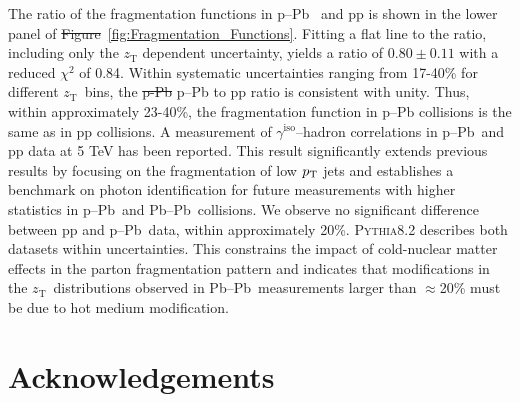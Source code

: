 \documentclass[ALICE,manyauthors]{cernphprep}
\newcommand{\zt}{\ensuremath{z_{\mathrm{T}}}\xspace}
\newcommand{\gammaiso}{\ensuremath{\gamma^\mathrm{iso}}}
\newcommand{\PbPb}         {\mbox{Pb--Pb}\xspace}
\newcommand{\pPb}          {\mbox{p--Pb}\xspace}
\newcommand{\pt}           {\ensuremath{p_{\rm T}}\xspace}
\providecommand{\DIFaddtex}[1]{{\protect\color{blue}\uwave{#1}}} %
\providecommand{\DIFdeltex}[1]{{\protect\color{red}\sout{#1}}}                      %
\providecommand{\DIFaddbegin}{} %
\providecommand{\DIFaddend}{} %
\providecommand{\DIFdelbegin}{} %
\providecommand{\DIFdelend}{} %
\providecommand{\DIFadd}[1]{\texorpdfstring{\DIFaddtex{#1}}{#1}} %
\providecommand{\DIFdel}[1]{\texorpdfstring{\DIFdeltex{#1}}{}} %
\newcommand{\DIFscaledelfig}{0.5}
\newlength{\DIFdelgraphicswidth} %
\newlength{\DIFdelgraphicsheight} %
\newcommand{\DIFaddincludegraphics}[2][]{{\color{blue}\fbox{\DIFOincludegraphics[#1]{#2}}}} %
\newcommand{\DIFdelincludegraphics}[2][]{%
\sbox{\DIFdelgraphicsbox}{\DIFOincludegraphics[#1]{#2}}%
\settoboxwidth{\DIFdelgraphicswidth}{\DIFdelgraphicsbox} %
\settoboxtotalheight{\DIFdelgraphicsheight}{\DIFdelgraphicsbox} %
\scalebox{\DIFscaledelfig}{%
\parbox[b]{\DIFdelgraphicswidth}{\usebox{\DIFdelgraphicsbox}\\[-\baselineskip] \rule{\DIFdelgraphicswidth}{0em}}\llap{\resizebox{\DIFdelgraphicswidth}{\DIFdelgraphicsheight}{%
\setlength{\unitlength}{\DIFdelgraphicswidth}%
\begin{picture}(1,1)%
\thicklines\linethickness{2pt} %
{\color[rgb]{1,0,0}\put(0,0){\framebox(1,1){}}}%
{\color[rgb]{1,0,0}\put(0,0){\line( 1,1){1}}}%
{\color[rgb]{1,0,0}\put(0,1){\line(1,-1){1}}}%
\end{picture}%
}\hspace*{3pt}}} %
} %
\DeclareRobustCommand{\DIFaddbegin}{\DIFOaddbegin \let\includegraphics\DIFaddincludegraphics} %
\DeclareRobustCommand{\DIFaddend}{\DIFOaddend \let\includegraphics\DIFOincludegraphics} %
\DeclareRobustCommand{\DIFdelbegin}{\DIFOdelbegin \let\includegraphics\DIFdelincludegraphics} %
\DeclareRobustCommand{\DIFdelend}{\DIFOaddend \let\includegraphics\DIFOincludegraphics} %
\begin{document}
The ratio of the fragmentation functions in \pPb~ and pp is shown in the lower panel of \DIFdelbegin \DIFdel{Figure}\DIFdelend \DIFaddbegin \DIFadd{Fig.}\DIFaddend ~\ref{fig:Fragmentation_Functions}. Fitting a flat line to the ratio, including only the \zt dependent uncertainty, yields a ratio of $0.80\pm0.11$ with a reduced $\chi^{2}$ of 0.84.  Within systematic uncertainties ranging from 17-40\% for different \zt~bins, the \DIFdelbegin \DIFdel{p-Pb }\DIFdelend \DIFaddbegin \pPb \DIFaddend to pp ratio is consistent with unity. Thus, within approximately 23-40\%, the fragmentation function in \pPb collisions is the same as in pp collisions.
\label{sec:conclusions}
A measurement of \gammaiso--hadron correlations in \pPb~and pp data at {5 TeV} has been reported. This result significantly extends previous results by focusing on the fragmentation of low $\pt$ jets and establishes a benchmark on photon identification for future measurements with higher statistics in \pPb~and \PbPb~collisions. We observe no significant difference between pp and \pPb~data, within approximately 20\%. \textsc{Pythia8.2} describes both datasets within uncertainties. This constrains the impact of cold-nuclear matter effects in the parton fragmentation pattern and indicates that  modifications in the \zt~distributions observed in \PbPb~measurements larger than $\approx$20\% must be due to hot medium modification.

 \FloatBarrier
\newenvironment{acknowledgement}{\relax}{\relax}
\begin{acknowledgement}
\section*{Acknowledgements}
\end{document}
